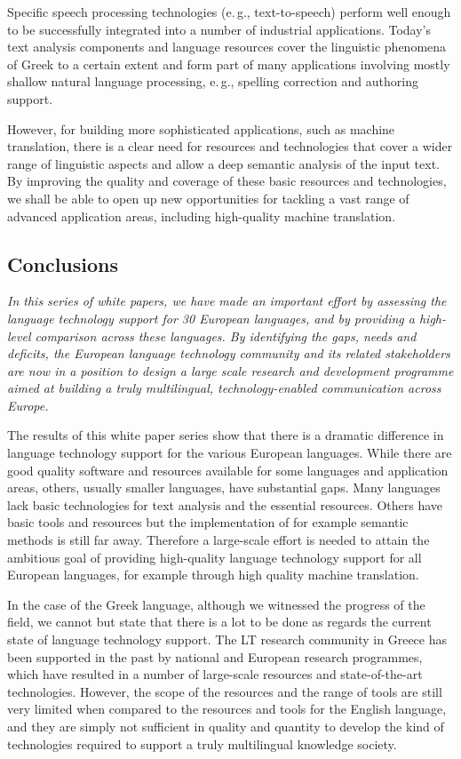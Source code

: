 \documentclass[]{../../metanetpaper}
\begin{document}
\begin{multicols}{2}
Specific speech processing technologies (e.\,g., text-to-speech) perform well enough to be successfully integrated into a number of industrial applications. Today’s text analysis components and language resources  cover the linguistic phenomena of Greek to a certain extent and form part of many applications involving mostly shallow natural language processing, e.\,g., spelling correction and authoring support.

However, for building more sophisticated applications, such as machine translation, there is a clear need for resources and technologies that cover a wider range of linguistic aspects and allow a deep semantic analysis of the input text. By improving the quality and coverage of these basic resources and technologies, we shall be able to open up new opportunities for tackling a vast range of advanced application areas, including high-quality machine translation.

\subsection{Conclusions}

\emph{In this series of white papers, we have made an important effort by assessing the language technology support for 30 European languages, and by providing a high-level comparison across these languages. By identifying the gaps, needs and deficits, the European language technology community and its related stakeholders are now in a position to design a large scale research and development programme aimed at building a truly multilingual, technology-enabled communication across Europe.}

The results of this white paper series show that there is a dramatic difference in language technology support for the various European languages. While there are good quality software and resources available for some languages and application areas, others, usually smaller languages, have substantial gaps. Many languages lack basic technologies for text analysis and the essential resources. Others have basic tools and resources but the implementation of for example semantic methods is still far away. Therefore a large-scale effort is needed to attain the ambitious goal of providing high-quality language technology support for all European languages, for example through high quality machine translation. 

In the case of the Greek language, although we witnessed the progress of the field, we cannot but state that there is a lot to be done as regards the current state of language technology support. The LT research community in Greece has been supported in the past by national and European research programmes, which have resulted in a number of large-scale resources and state-of-the-art technologies. However, the scope of the resources and the range of tools are still very limited when compared to the resources and tools for the English language, and they are simply not sufficient in quality and quantity to develop the kind of technologies required to support a truly multilingual knowledge society.


\end{multicols}
\end{document}
